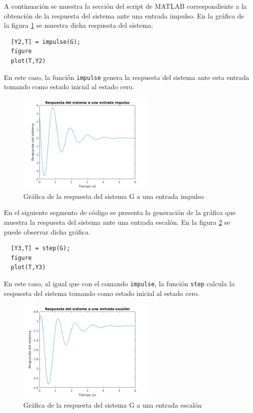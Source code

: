 \documentclass[12pt,letterpaper]{article}
\begin{document}
A continuación  se muestra la sección del script de MATLAB correspondiente a la obtención de la 
respuesta del sistema ante una entrada impulso. En la gráfica de la figura \ref{fig:respuesta_impulso} 
se muestra dicha respuesta del sistema.

\begin{lstlisting}[style=Matlab-editor, basicstyle=\mlttfamily]
  % Respuesta al impulso 
  [Y2,T] = impulse(G);
  figure
  plot(T,Y2)
\end{lstlisting}

En este caso, la función \texttt{impulse} genera la respuesta del sistema ante esta entrada tomando
como estado inicial al estado cero. 

\begin{figure}[ht!]
	\centering
	\includegraphics[width=0.6\textwidth]{pictures/Ejercicio5/respuesta_impulso}
	\caption{Gráfica de la respuesta del sistema G a una entrada impulso}
	\label{fig:respuesta_impulso}
\end{figure} 




En el siguiente segmento de código se presenta la generación de la gráfica que muestra la respuesta
del sistema ante una entrada escalón. En la figura \ref{fig:respuesta_escalon} se puede observar
dicha gráfica.

\begin{lstlisting}[style=Matlab-editor, basicstyle=\mlttfamily]
  % Respuesta a una entrada escalon
  [Y3,T] = step(G);
  figure
  plot(T,Y3)
\end{lstlisting}

En este caso, al igual que con el comando \texttt{impulse}, la función \texttt{step} calcula la respuesta del
sistema tomando como estado inicial al estado cero.

\begin{figure}[ht!]
	\centering
	\includegraphics[width=0.6\textwidth]{pictures/Ejercicio5/respuesta_escalon}
	\caption{Gráfica de la respuesta del sistema G a una entrada escalón}
	\label{fig:respuesta_escalon}
\end{figure} 
\end{document}
